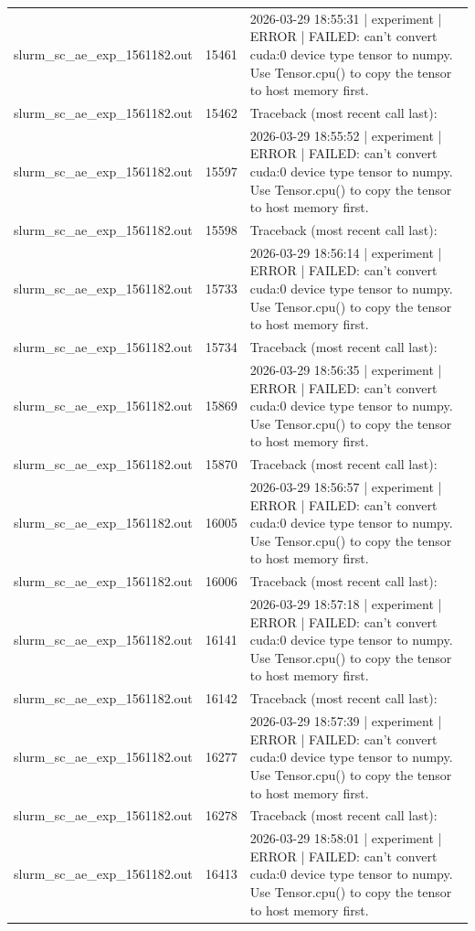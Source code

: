 \begin{tabular}{lrl}
slurm\_sc\_ae\_exp\_1561182.out & 15461 & 2026-03-29 18:55:31 | experiment | ERROR |   FAILED: can't convert cuda:0 device type tensor to numpy. Use Tensor.cpu() to copy the tensor to host memory first. \\
slurm\_sc\_ae\_exp\_1561182.out & 15462 & Traceback (most recent call last): \\
slurm\_sc\_ae\_exp\_1561182.out & 15597 & 2026-03-29 18:55:52 | experiment | ERROR |   FAILED: can't convert cuda:0 device type tensor to numpy. Use Tensor.cpu() to copy the tensor to host memory first. \\
slurm\_sc\_ae\_exp\_1561182.out & 15598 & Traceback (most recent call last): \\
slurm\_sc\_ae\_exp\_1561182.out & 15733 & 2026-03-29 18:56:14 | experiment | ERROR |   FAILED: can't convert cuda:0 device type tensor to numpy. Use Tensor.cpu() to copy the tensor to host memory first. \\
slurm\_sc\_ae\_exp\_1561182.out & 15734 & Traceback (most recent call last): \\
slurm\_sc\_ae\_exp\_1561182.out & 15869 & 2026-03-29 18:56:35 | experiment | ERROR |   FAILED: can't convert cuda:0 device type tensor to numpy. Use Tensor.cpu() to copy the tensor to host memory first. \\
slurm\_sc\_ae\_exp\_1561182.out & 15870 & Traceback (most recent call last): \\
slurm\_sc\_ae\_exp\_1561182.out & 16005 & 2026-03-29 18:56:57 | experiment | ERROR |   FAILED: can't convert cuda:0 device type tensor to numpy. Use Tensor.cpu() to copy the tensor to host memory first. \\
slurm\_sc\_ae\_exp\_1561182.out & 16006 & Traceback (most recent call last): \\
slurm\_sc\_ae\_exp\_1561182.out & 16141 & 2026-03-29 18:57:18 | experiment | ERROR |   FAILED: can't convert cuda:0 device type tensor to numpy. Use Tensor.cpu() to copy the tensor to host memory first. \\
slurm\_sc\_ae\_exp\_1561182.out & 16142 & Traceback (most recent call last): \\
slurm\_sc\_ae\_exp\_1561182.out & 16277 & 2026-03-29 18:57:39 | experiment | ERROR |   FAILED: can't convert cuda:0 device type tensor to numpy. Use Tensor.cpu() to copy the tensor to host memory first. \\
slurm\_sc\_ae\_exp\_1561182.out & 16278 & Traceback (most recent call last): \\
slurm\_sc\_ae\_exp\_1561182.out & 16413 & 2026-03-29 18:58:01 | experiment | ERROR |   FAILED: can't convert cuda:0 device type tensor to numpy. Use Tensor.cpu() to copy the tensor to host memory first. \\

\end{tabular}
